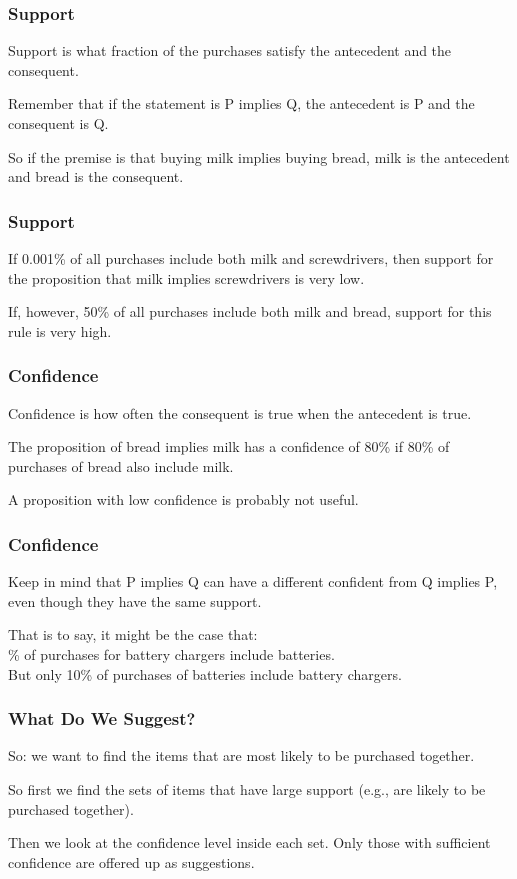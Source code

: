 \begin{frame}
\frametitle{Support}

Support is what fraction of the purchases satisfy the antecedent and the consequent. 

Remember that if the statement is P implies Q, the antecedent is P and the consequent is Q. 

So if the premise is that buying milk implies buying bread, milk is the antecedent and bread is the consequent. 

\end{frame}


\begin{frame}
\frametitle{Support}

If 0.001\% of all purchases include both milk and screwdrivers, then support for the proposition that milk implies screwdrivers is very low. 

If, however, 50\% of all purchases include both milk and bread, support for this rule is very high.

\end{frame}

\begin{frame}
\frametitle{Confidence}

Confidence is how often the consequent is true when the antecedent is true. 

The proposition of bread implies milk has a confidence of 80\% if 80\% of purchases of bread also include milk. 

A proposition with low confidence is probably not useful. 

\end{frame}

\begin{frame}
\frametitle{Confidence}

Keep in mind that P implies Q can have a different confident from Q implies P, even though they have the same support. 

That is to say, it might be the case that: \\
\% of purchases for battery chargers include batteries.\\
\quad But only 10\% of purchases of batteries include battery chargers.


\end{frame}

\begin{frame}
\frametitle{What Do We Suggest?}

So: we want to find the items that are most likely to be purchased together. 

So first we find the sets of items that have large support (e.g., are likely to be purchased together). 

Then we look at the confidence level inside each set. Only those with sufficient confidence are offered up as suggestions. 

\end{frame}

